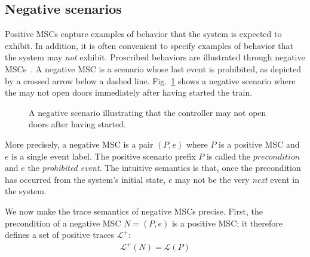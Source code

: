 \subsection{Negative scenarios\label{subsection:background-negative-scenarios}}

Positive MSCs capture examples of behavior that the system is expected to exhibit. In addition, it is often convenient to specify examples of behavior that the system may \emph{not} exhibit. Proscribed behaviors are illustrated through negative MSCs~\cite{Uchitel:2002, Uchitel:2004}. A negative MSC is a scenario whose last event is prohibited, as depicted by a crossed arrow below a dashed line. Fig.~\ref{image:train-negative-scenario} shows a negative scenario where the  may not open doors immediately after having started the train.

\begin{figure}
\centering
{}
\caption{A negative scenario illustrating that the controller may not open doors after having started.\label{image:train-negative-scenario}}
\end{figure}

More precisely, a negative MSC is a pair $(P,e)$ where $P$ is a positive MSC and $e$ is a single event label. The positive scenario prefix $P$ is called the $precondition$ and $e$ the \emph{prohibited event}. The intuitive semantics is that, once the precondition has occurred from the system's initial state, $e$ may not be the very \emph{next} event in the system. 

We now make the trace semantics of negative MSCs precise. First, the precondition of a negative MSC $N = (P,e)$ is a positive MSC; it therefore defines a set of positive traces $\mathcal{L}^{+}$:
\begin{align}
\mathcal{L}^{+}(N) = \mathcal{L}(P)
\end{align}

